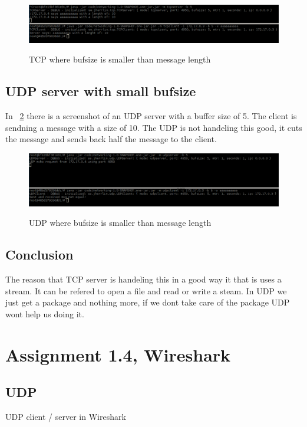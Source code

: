 \documentclass[a4paper,12pt]{article} %
\begin{document}
{\begin{figure}[H]
    \centering  
    \includegraphics[scale=0.33]{img/assignment13tcp.png}
	\label{fig:assignment13tcp}
	\caption{TCP where bufsize is smaller than message length}
\end{figure}

\subsection{UDP server with small bufsize}

In ~\ref{fig:assignment13udp} there is a screenshot of an UDP server with a buffer size of 5.
The client is sendning a message with a size of 10.
The UDP is not handeling this good, it cuts the message and sends back half the message to the client.

\begin{figure}[H]
    \centering  
    \includegraphics[scale=0.33]{img/assignment13udp.png}
	\label{fig:assignment13udp}
	\caption{UDP where bufsize is smaller than message length}
\end{figure}


\subsection{Conclusion}

The reason that TCP server is handeling this in a good way it that is uses a stream.
It can be refered to open a file and read or write a steam. 
In UDP we just get a package and nothing more, if we dont take care of the package 
UDP wont help us doing it.


\clearpage

\section{Assignment 1.4, Wireshark}

\subsection{UDP}
UDP client / server in Wireshark
}
\end{document}
